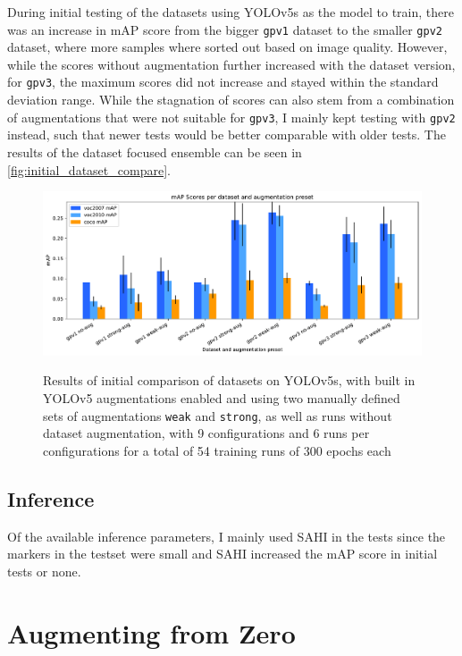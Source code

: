 \documentclass[10pt]{book}
\begin{document}
During initial testing of the datasets using \ac{YOLO}v5s as the model to train, there was an increase in \ac{mAP} score from the bigger \texttt{gpv1} dataset to the smaller \texttt{gpv2} dataset, where more samples where sorted out based on image quality. However, while the scores without augmentation further increased with the dataset version, for \texttt{gpv3}, the maximum scores did not increase and stayed within the standard deviation range. While the stagnation of scores can also stem from a combination of augmentations that were not suitable for \texttt{gpv3}, I mainly kept testing with \texttt{gpv2} instead, such that newer tests would be better comparable with older tests. The results of the dataset focused ensemble can be seen in \autoref{fig:initial_dataset_compare}.


\begin{figure}
  \caption{Results of initial comparison of datasets on \ac{YOLO}v5s, with built in \ac{YOLO}v5 augmentations enabled and using two manually defined sets of augmentations \texttt{weak} and \texttt{strong}, as well as runs without dataset augmentation, with 9 configurations and 6 runs per configurations for a total of 54 training runs of 300 epochs each}
  \includegraphics[width=\textwidth]{image/gp-compare-v2-thesis}
  \label{fig:initial_dataset_compare}
\end{figure}

\subsection{Inference}

Of the available inference parameters, I mainly used \ac{SAHI} in the tests since the markers in the testset were small and \ac{SAHI} increased the \ac{mAP} score in initial tests or none.

\section{Augmenting from Zero} %
\label{sec:aug_ens_zero}
\end{document}
